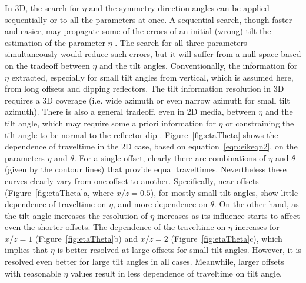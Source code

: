 In 3D, the search for $\eta$ and the symmetry direction angles can be applied  
sequentially or  to all the parameters at once. A sequential search, though
faster and easier, may propagate some of the errors of an initial
(wrong) tilt  the estimation of the parameter $\eta$ \cite[]{ttt}. The
search for all three parameters simultaneously would reduce such errors, but it will suffer from a null space based on the tradeoff between
$\eta$ and the tilt angles. Conventionally, the information for $\eta$   extracted, especially for small tilt angles from vertical,
which is assumed here, from long offsets and dipping reflectors. The tilt information resolution in 3D requires a 3D coverage
(i.e. wide azimuth or even narrow azimuth for small tilt azimuth). There is also a general tradeoff, even in 2D media, between $\eta$ and the
tilt angle, which may require some a priori information for $\eta$ or constraining the tilt angle to be normal to the reflector dip \cite[]{SEG-2000-09650968}.
Figure~\ref{fig:etaTheta} shows the dependence of traveltime in the 2D case, based on equation~\ref{eqn:eikeqn2}, on the 
parameters $\eta$ and $\theta$. For a single offset, clearly there are combinations of $\eta$ and $\theta$ (given by the contour lines) that provide
equal traveltimes. Nevertheless these curves clearly vary from one offset to another. Specifically, near offsets (Figure~\ref{fig:etaTheta}a,
where $x/z=0.5$), for mostly small tilt angles, show little
dependence of traveltime on $\eta$, and more dependence on $\theta$. 
On the other hand, as the tilt angle increases the resolution of $\eta$ increases as
its influence starts to affect even the shorter offsets. The dependence of the traveltime
on $\eta$ increases for $x/z=1$ (Figure~\ref{fig:etaTheta}b) and $x/z=2$ 
(Figure~\ref{fig:etaTheta}c), which implies that $\eta$ is better resolved at large offsets for small tilt angles. However, it is resolved even better for
large tilt angles in all cases. Meanwhile, larger offsets with reasonable $\eta$ values result in less dependence of  traveltime on tilt angle.

